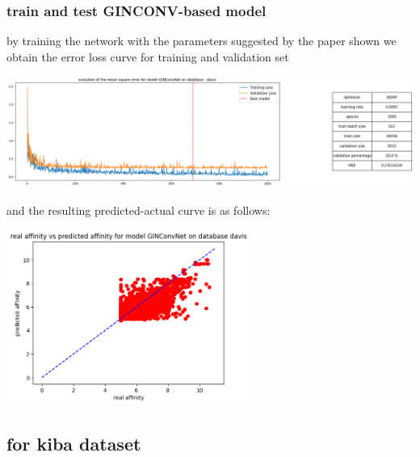 \documentclass[11pt, a4paper]{article}
\begin{document}
        \subsubsection{train and test GINCONV-based model}
        by training the network with the parameters suggested by the paper shown we obtain the error loss curve for training and validation set 
        \begin{center}
            \includegraphics[width=1.0\textwidth]{train_test_plots/davis GInCONV train.png}
        \end{center}
        and the resulting predicted-actual curve is as follows:
        \begin{center}
            \includegraphics[width=0.6\textwidth]{train_test_plots/davis GINCONV test.png}
        \end{center}
    
    \subsection{for kiba dataset}
\end{document}
